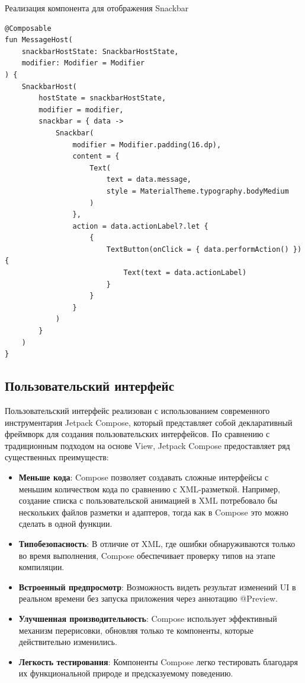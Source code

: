 \documentclass[14pt, russian]{scrartcl}
\begin{document}
\begin{listing}[!htb]
\caption{Реализация компонента для отображения Snackbar}
\vspace{-0.3cm}
\label{lst:snackbar}
\begin{verbatim}
@Composable
fun MessageHost(
    snackbarHostState: SnackbarHostState,
    modifier: Modifier = Modifier
) {
    SnackbarHost(
        hostState = snackbarHostState,
        modifier = modifier,
        snackbar = { data ->
            Snackbar(
                modifier = Modifier.padding(16.dp),
                content = {
                    Text(
                        text = data.message,
                        style = MaterialTheme.typography.bodyMedium
                    )
                },
                action = data.actionLabel?.let {
                    {
                        TextButton(onClick = { data.performAction() }) {
                            Text(text = data.actionLabel)
                        }
                    }
                }
            )
        }
    )
}
\end{verbatim}
\end{listing}

\subsection{Пользовательский интерфейс}\label{sect:ui}

Пользовательский интерфейс реализован с использованием современного инструментария Jetpack Compose, который представляет собой декларативный фреймворк для создания пользовательских интерфейсов. По сравнению с традиционным подходом на основе View, Jetpack Compose предоставляет ряд существенных преимуществ:

\begin{itemize}
\item \textbf{Меньше кода}: Compose позволяет создавать сложные интерфейсы с меньшим количеством кода по сравнению с XML-разметкой. Например, создание списка с пользовательской анимацией в XML потребовало бы нескольких файлов разметки и адаптеров, тогда как в Compose это можно сделать в одной функции.

\item \textbf{Типобезопасность}: В отличие от XML, где ошибки обнаруживаются только во время выполнения, Compose обеспечивает проверку типов на этапе компиляции.

\item \textbf{Встроенный предпросмотр}: Возможность видеть результат изменений UI в реальном времени без запуска приложения через аннотацию @Preview.

\item \textbf{Улучшенная производительность}: Compose использует эффективный механизм перерисовки, обновляя только те компоненты, которые действительно изменились.

\item \textbf{Легкость тестирования}: Компоненты Compose легко тестировать благодаря их функциональной природе и предсказуемому поведению.
\end{itemize}
\end{document}
